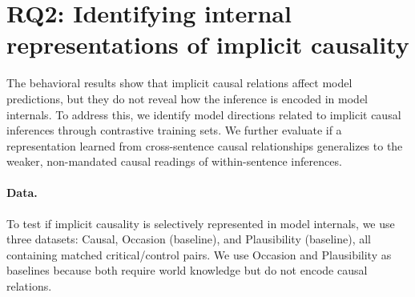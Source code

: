 \documentclass[11pt]{article}
\begin{document}


\section{RQ2: Identifying internal representations of implicit causality}
\label{sec:representations}

The behavioral results show that implicit causal relations affect model predictions, but they do not reveal how the inference is encoded in model internals. To address this, we identify model directions related to implicit causal inferences through contrastive training sets. We further evaluate if a representation learned from cross-sentence causal relationships generalizes to the weaker, non-mandated causal readings of within-sentence inferences.

\paragraph{Data.} To test if implicit causality is selectively represented in model internals, we use three datasets: Causal, Occasion (baseline), and Plausibility (baseline), all containing matched critical/control pairs. We use Occasion and Plausibility as baselines because both require world knowledge but do not encode causal relations. 
\end{document}
